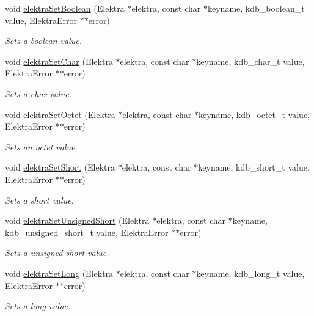 \begin{DoxyCompactItemize}
void \hyperlink{group__highlevel_ga3d703756b43b1ca85296f894e80e22e2}{elektra\+Set\+Boolean} (Elektra $\ast$elektra, const char $\ast$keyname, kdb\+\_\+boolean\+\_\+t value, Elektra\+Error $\ast$$\ast$error)
\begin{DoxyCompactList}\small\item\em Sets a boolean value. \end{DoxyCompactList}\item 
void \hyperlink{group__highlevel_ga5e00b3685b0ec462a4f377481b786787}{elektra\+Set\+Char} (Elektra $\ast$elektra, const char $\ast$keyname, kdb\+\_\+char\+\_\+t value, Elektra\+Error $\ast$$\ast$error)
\begin{DoxyCompactList}\small\item\em Sets a char value. \end{DoxyCompactList}\item 
void \hyperlink{group__highlevel_ga8ad9e3df6cf7868a38604d29122f4e21}{elektra\+Set\+Octet} (Elektra $\ast$elektra, const char $\ast$keyname, kdb\+\_\+octet\+\_\+t value, Elektra\+Error $\ast$$\ast$error)
\begin{DoxyCompactList}\small\item\em Sets an octet value. \end{DoxyCompactList}\item 
void \hyperlink{group__highlevel_ga067b1785a444fd98349e0e2b9f43ce3e}{elektra\+Set\+Short} (Elektra $\ast$elektra, const char $\ast$keyname, kdb\+\_\+short\+\_\+t value, Elektra\+Error $\ast$$\ast$error)
\begin{DoxyCompactList}\small\item\em Sets a short value. \end{DoxyCompactList}\item 
void \hyperlink{group__highlevel_gaf2e211a564bd082715e3256ceaf5e1c3}{elektra\+Set\+Unsigned\+Short} (Elektra $\ast$elektra, const char $\ast$keyname, kdb\+\_\+unsigned\+\_\+short\+\_\+t value, Elektra\+Error $\ast$$\ast$error)
\begin{DoxyCompactList}\small\item\em Sets a unsigned short value. \end{DoxyCompactList}\item 
void \hyperlink{group__highlevel_gaf2564ca6e0e4440359074a0b59a02344}{elektra\+Set\+Long} (Elektra $\ast$elektra, const char $\ast$keyname, kdb\+\_\+long\+\_\+t value, Elektra\+Error $\ast$$\ast$error)
\begin{DoxyCompactList}\small\item\em Sets a long value. \end{DoxyCompactList}\item 

\end{DoxyCompactItemize}
